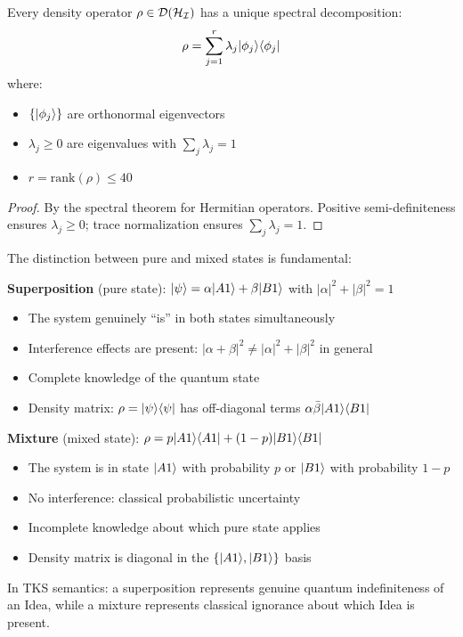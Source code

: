 \begin{theorem}
\label{thm:density-spectral}
Every density operator $\rho \in \mathcal{D}(\mathcal{H}_{\mathcal{I}})$ has a unique spectral decomposition:
\[
\rho = \sum_{j=1}^{r} \lambda_j |\phi_j\rangle\langle \phi_j|
\]
where:
\begin{itemize}
  \item $\{|\phi_j\rangle\}$ are orthonormal eigenvectors
  \item $\lambda_j \geq 0$ are eigenvalues with $\sum_j \lambda_j = 1$
  \item $r = \mathrm{rank}(\rho) \leq 40$
\end{itemize}
\end{theorem}

\begin{proof}
By the spectral theorem for Hermitian operators. Positive semi-definiteness ensures $\lambda_j \geq 0$; trace normalization ensures $\sum_j \lambda_j = 1$.
\end{proof}

\begin{remark}
\label{rem:superposition-vs-mixture}
The distinction between pure and mixed states is fundamental:

\textbf{Superposition} (pure state): $|\psi\rangle = \alpha|A1\rangle + \beta|B1\rangle$ with $|\alpha|^2 + |\beta|^2 = 1$
\begin{itemize}
  \item The system genuinely ``is'' in both states simultaneously
  \item Interference effects are present: $|\alpha + \beta|^2 \neq |\alpha|^2 + |\beta|^2$ in general
  \item Complete knowledge of the quantum state
  \item Density matrix: $\rho = |\psi\rangle\langle \psi|$ has off-diagonal terms $\alpha\bar{\beta}|A1\rangle\langle B1|$
\end{itemize}

\textbf{Mixture} (mixed state): $\rho = p|A1\rangle\langle A1| + (1-p)|B1\rangle\langle B1|$
\begin{itemize}
  \item The system is in state $|A1\rangle$ with probability $p$ or $|B1\rangle$ with probability $1-p$
  \item No interference: classical probabilistic uncertainty
  \item Incomplete knowledge about which pure state applies
  \item Density matrix is diagonal in the $\{|A1\rangle, |B1\rangle\}$ basis
\end{itemize}

In TKS semantics: a superposition represents genuine quantum indefiniteness of an Idea, while a mixture represents classical ignorance about which Idea is present.
\end{remark}

